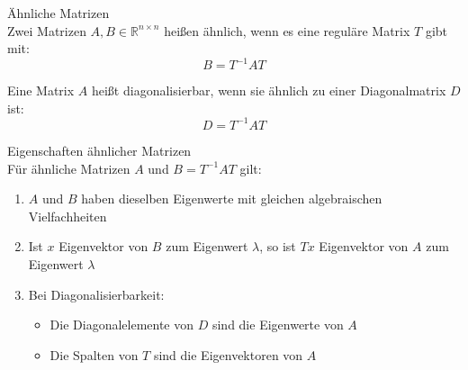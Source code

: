 \begin{concept}{Ähnliche Matrizen}\\
Zwei Matrizen $A,B \in \mathbb{R}^{n\times n}$ heißen ähnlich, wenn es eine reguläre Matrix $T$ gibt mit:
$$B = T^{-1}AT$$

Eine Matrix $A$ heißt diagonalisierbar, wenn sie ähnlich zu einer Diagonalmatrix $D$ ist:
$$D = T^{-1}AT$$
\end{concept}

\begin{theorem}{Eigenschaften ähnlicher Matrizen}\\
Für ähnliche Matrizen $A$ und $B = T^{-1}AT$ gilt:
\begin{enumerate}
    \item $A$ und $B$ haben dieselben Eigenwerte mit gleichen algebraischen Vielfachheiten
    \item Ist $x$ Eigenvektor von $B$ zum Eigenwert $\lambda$, so ist $Tx$ Eigenvektor von $A$ zum Eigenwert $\lambda$
    \item Bei Diagonalisierbarkeit:
    \begin{itemize}
        \item Die Diagonalelemente von $D$ sind die Eigenwerte von $A$
        \item Die Spalten von $T$ sind die Eigenvektoren von $A$
    \end{itemize}
\end{enumerate}
\end{theorem}


